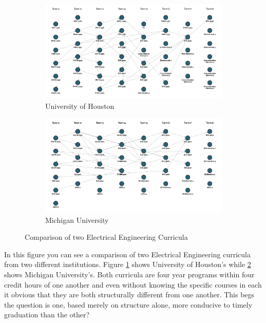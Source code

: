 \documentclass[botnum, fleqn]{unmeethesis}
\begin{document}
\begin{figure}
  \centering
  \begin{subfigure}[h!]{.6\linewidth}
    \includegraphics[width=\linewidth]{./figures/UH.jpg}
    \caption{University of Houston}\label{fig:UH}
  \end{subfigure}

  \vspace{1cm}

  \begin{subfigure}[h!]{.6\linewidth}
    \includegraphics[width=\linewidth]{./figures/MU.jpg}
    \caption{Michigan University}\label{fig:MU}
  \end{subfigure}

  \caption{Comparison of two Electrical Engineering Curricula}
  \label{fig:comparison}
\end{figure}

In this figure you can see a comparison of two Electrical Engineering curricula from two different institutions. Figure \ref{fig:UH} shows University of Houston's while \ref{fig:MU} shows Michigan University's. Both curricula are four year programs within four credit hours of one another and even without knowing the specific courses in each it obvious that they are both structurally different from one another. This begs the question is one, based merely on structure alone, more conducive to timely graduation than the other?
\end{document}
